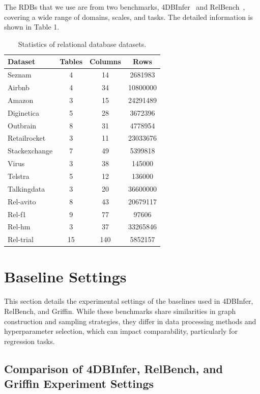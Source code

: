 \documentclass{article}
\theoremstyle{plain}
\theoremstyle{definition}
\theoremstyle{remark}
\begin{document}
The RDBs that we use are from two benchmarks, 4DBInfer~\cite{wang20244dbinfer} and RelBench~\citep{robinson2024relbench}, covering a wide range of domains, scales, and tasks. The detailed information is shown in Table 1.

\begin{table}[H]
    \centering
    \begin{tabular}{|l|c|c|c|}
        \hline
        \textbf{Dataset} & \textbf{Tables} & \textbf{Columns} & \textbf{Rows} \\
        \hline
        Seznam & 4 & 14 & 2681983 \\
        Airbnb & 4 & 34 & 10800000 \\
        Amazon & 3 & 15 & 24291489 \\
        Diginetica & 5 & 28 & 3672396 \\
        Outbrain & 8 & 31 & 4778954 \\
        Retailrocket & 3 & 11 & 23033676 \\
        Stackexchange & 7 & 49 & 5399818 \\
        Virus & 3 & 38 & 145000 \\
        Telstra & 5 & 12 & 136000 \\
        Talkingdata & 3 & 20 & 36600000 \\
        Rel-avito & 8 & 43 & 20679117 \\
        Rel-f1 & 9 & 77 & 97606 \\
        Rel-hm & 3 & 37 & 33265846 \\
        Rel-trial & 15 & 140 & 5852157 \\
        \hline
    \end{tabular}
    \caption{Statistics of relational database datasets.}
    \label{tab:rdb_stats}
\end{table}

\section{Baseline Settings}
\label{app:baselines}

This section details the experimental settings of the baselines used in 4DBInfer, RelBench, and Griffin. While these benchmarks share similarities in graph construction and sampling strategies, they differ in data processing methods and hyperparameter selection, which can impact comparability, particularly for regression tasks.

\subsection{Comparison of 4DBInfer, RelBench, and Griffin Experiment Settings}
\end{document}
